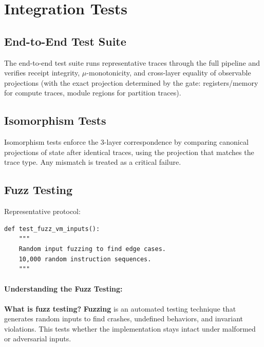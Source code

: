 \section{Integration Tests}

\subsection{End-to-End Test Suite}

The end-to-end test suite runs representative traces through the full pipeline and verifies receipt integrity, $\mu$-monotonicity, and cross-layer equality of observable projections (with the exact projection determined by the gate: registers/memory for compute traces, module regions for partition traces).

\subsection{Isomorphism Tests}

Isomorphism tests enforce the 3-layer correspondence by comparing canonical projections of state after identical traces, using the projection that matches the trace type. Any mismatch is treated as a critical failure.

\subsection{Fuzz Testing}

Representative protocol:
\begin{lstlisting}
def test_fuzz_vm_inputs():
    """
    Random input fuzzing to find edge cases.
    10,000 random instruction sequences.
    """
\end{lstlisting}

\paragraph{Understanding the Fuzz Testing:}

\textbf{What is fuzz testing?} \textbf{Fuzzing} is an automated testing technique that generates random inputs to find crashes, undefined behaviors, and invariant violations. This tests whether the implementation stays intact under malformed or adversarial inputs.

